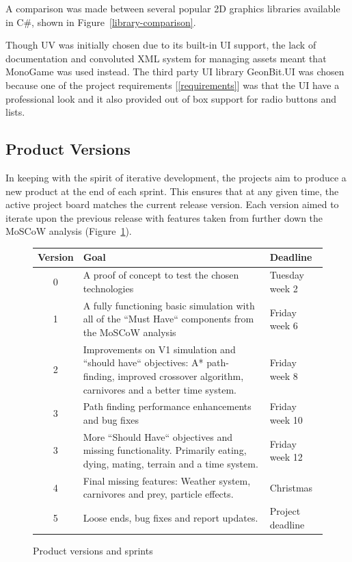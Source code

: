 \documentclass[a4paper, oneside, 11pt]{report}
\begin{document}
A comparison was made between several popular 2D graphics libraries available in C\#, shown in Figure~\ref{library-comparison}.

Though UV was initially chosen due to its built-in UI support, the lack of documentation and convoluted XML system for managing assets meant that MonoGame was used instead. The third party UI library GeonBit.UI was chosen because one of the project requirements [\ref{requirements}] was that the UI have a professional look and it also provided out of box support for radio buttons and lists.

\subsection{Product Versions}\label{versioning}
In keeping with the spirit of iterative development, the projects aim to produce a new product at the end of each sprint. This ensures that at any given time, the active project board matches the current release version. Each version aimed to iterate upon the previous release with features taken from further down the MoSCoW analysis (Figure~\ref{version-table}).

\smallskip 
\begin{figure}[H]
	\caption{Product versions and sprints} \label{version-table}
	\centering
	\begin{tabular}{c|p{}|l}
		Version & Goal & Deadline \\ \hline
		0 & A proof of concept to test the chosen technologies & Tuesday week 2 \\ \hline
		1 & A fully functioning basic simulation with all of the ``Must Have`` components from the MoSCoW analysis & Friday week 6 \\ \hline
		2 & Improvements on V1 simulation and ``should have`` objectives: A* path-finding, improved crossover algorithm, carnivores and a better time system. & Friday week 8 \\ \hline
		3 & Path finding performance enhancements and bug fixes & Friday week 10 \\ \hline
		3 & More ``Should Have`` objectives and missing functionality. Primarily eating, dying, mating, terrain and a time system. & Friday week 12 \\ \hline
		4 & Final missing features: Weather system, carnivores and prey, particle effects. & Christmas \\ \hline
		5 & Loose ends, bug fixes and report updates. & Project deadline \\ \hline
	\end{tabular}
\end{figure}
\smallskip 
\end{document}
